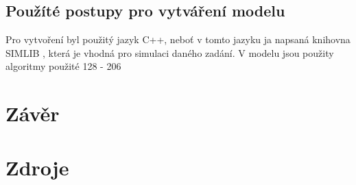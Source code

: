 \documentclass[11pt,a4paper]{article}
\begin{document}
  \subsection{Použíté postupy pro vytváření modelu}
  Pro vytvoření byl použitý jazyk C++, neboť v tomto jazyku ja napsaná knihovna SIMLIB \cite{SIMLIB},
  která je vhodná pro simulaci daného zadání. V modelu jsou použity algoritmy použité
  128  - 206


	\section{Závěr}

	\section{Zdroje}
		
\end{document}
